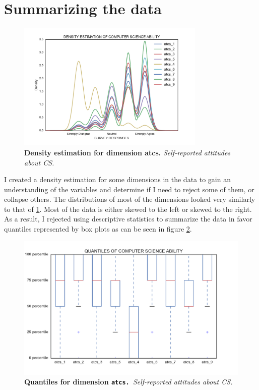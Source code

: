 \section*{Summarizing the data}
\begin{figure}[!hbtp]
\centering
    \caption{\textbf{Density estimation for dimension atcs. }\textit{Self-reported attitudes about CS.}}\label{atcs}
    \includegraphics[width=0.8\textwidth]{figures/atcs}
\end{figure}
I created a density estimation for some dimensions in the data to gain an understanding of the variables and determine if I need to reject some of them, or collapse others. The distributions of most of the dimensions looked very similarly to that of \ref{atcs}. Most of the data is either skewed to the left or skewed to the right. As a result, I rejected using descriptive statistics to summarize the data in favor quantiles represented by box plots as can be seen in figure \ref{atcs_dimension}. 
\begin{figure}[!hbtp]
\centering
    \caption{\textbf{Quantiles for dimension \texttt{atcs. }}\textit{Self-reported attitudes about CS.}}\label{atcs_dimension}
    \includegraphics[width=1\textwidth]{figures/atcs_quantile}
\end{figure}

